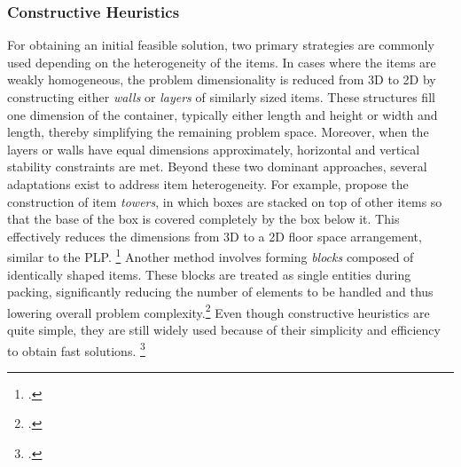 

\subsubsection{Constructive Heuristics}
For obtaining an initial feasible solution, two primary strategies are commonly
used depending on the heterogeneity of the items. In cases where the items are weakly homogeneous,
the problem dimensionality is reduced from 3D to 2D by constructing either
\textit{walls} or \textit{layers} of similarly sized items. These structures fill one
dimension of the container, typically either length and height or width and length, thereby
simplifying the remaining problem space. Moreover, when the layers or walls have
equal dimensions approximately, horizontal and vertical stability constraints are met.
Beyond these two dominant approaches, several adaptations exist to address item heterogeneity.
For example, \textcite{gehring_genetic_1997} propose the construction of item
\textit{towers}, in which boxes are stacked on top of other items so that the base of the box is covered completely
by the box below it.
This effectively reduces the dimensions from 3D to a 2D floor space arrangement,
similar to the \gls{PLP}. \footcite[cf.][pp. 402--406]{gehring_genetic_1997}
Another method involves forming \textit{blocks} composed of identically shaped items.
These blocks are treated as single entities
during packing, significantly reducing the number of elements to be handled and thus
lowering overall problem complexity.\footcite[cf.][p. 801]{liu_novel_2011} Even though constructive heuristics are quite simple,
they are still widely used because of their simplicity and efficiency to obtain fast solutions.
\footcite[cf.][pp. 11--13]{tamke_branch-and-cut_2024}

